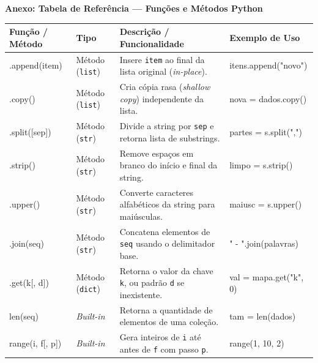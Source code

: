 \clearpage

\begin{center}
    {\Large \textbf{Anexo: Tabela de Referência — Funções e Métodos Python}}
\end{center}

\vspace{0.15cm}


\vspace{0.3cm}

\begin{center}
\renewcommand{\arraystretch}{1.22}
\small
\begin{tabularx}{\textwidth}{@{} >{\ttfamily}l l >{\RaggedRight}X >{\ttfamily}l @{}}
\toprule
\textbf{\textsf{Função / Método}} & \textbf{\textsf{Tipo}} & \textbf{\textsf{Descrição / Funcionalidade}} & \textbf{\textsf{Exemplo de Uso}} \\
\midrule
.append(item) & Método (\texttt{list}) & Insere \texttt{item} ao final da lista original (\emph{in-place}). & itens.append("novo") \\
.copy() & Método (\texttt{list}) & Cria cópia rasa (\emph{shallow copy}) independente da lista. & nova = dados.copy() \\
.split([sep]) & Método (\texttt{str}) & Divide a string por \texttt{sep} e retorna lista de substrings. & partes = s.split(",") \\
.strip() & Método (\texttt{str}) & Remove espaços em branco do início e final da string. & limpo = s.strip() \\
.upper() & Método (\texttt{str}) & Converte caracteres alfabéticos da string para maiúsculas. & maiusc = s.upper() \\
.join(seq) & Método (\texttt{str}) & Concatena elementos de \texttt{seq} usando o delimitador base. & " - ".join(palavras) \\
.get(k[, d]) & Método (\texttt{dict}) & Retorna o valor da chave \texttt{k}, ou padrão \texttt{d} se inexistente. & val = mapa.get("k", 0) \\
\midrule
len(seq) & \emph{Built-in} & Retorna a quantidade de elementos de uma coleção. & tam = len(dados) \\
range(i, f[, p]) & \emph{Built-in} & Gera inteiros de \texttt{i} até antes de \texttt{f} com passo \texttt{p}. & range(1, 10, 2) \\

\end{tabularx}
\end{center}
